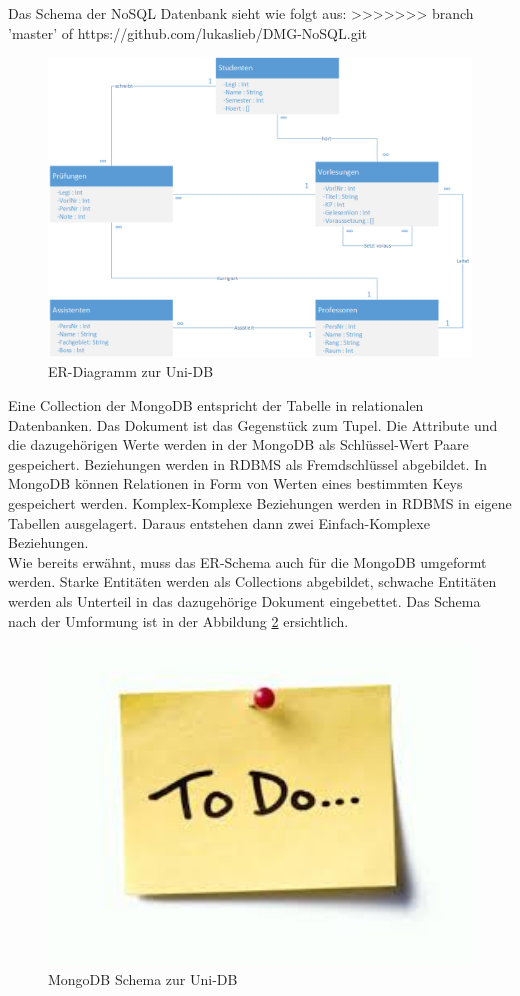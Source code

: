 \newpage
Das Schema der NoSQL Datenbank sieht wie folgt aus:
>>>>>>> branch 'master' of https://github.com/lukaslieb/DMG-NoSQL.git
\begin{figure}[h] 
	\centering
		\includegraphics[width=1\textwidth]{./pictures/NoSQL-DB_ER_Diagramm_UNI-DB.png}
	\caption{ER-Diagramm zur Uni-DB}
	\label{fig:uni-db}
\end{figure}
Eine Collection der MongoDB entspricht der Tabelle in relationalen Datenbanken.
Das Dokument ist das Gegenstück zum Tupel. Die Attribute und die dazugehörigen
Werte werden in der MongoDB als Schlüssel-Wert Paare gespeichert.
Beziehungen werden in RDBMS als Fremdschlüssel abgebildet. In MongoDB 
können Relationen in Form von Werten eines bestimmten Keys gespeichert werden.
Komplex-Komplexe Beziehungen werden in RDBMS in eigene
Tabellen ausgelagert. Daraus entstehen dann zwei Einfach-Komplexe
Beziehungen. \\
Wie bereits erwähnt, muss das ER-Schema auch für die MongoDB umgeformt werden.
Starke Entitäten werden als Collections abgebildet, schwache Entitäten werden 
als Unterteil in das dazugehörige Dokument eingebettet.
Das Schema nach der Umformung ist in der Abbildung \ref{fig:uni-dbNoSQL}
ersichtlich.
\begin{figure}[h] 
	\centering
		\includegraphics[width=1\textwidth]{./pictures/todo.jpg}
	\caption{MongoDB Schema zur Uni-DB }
	\label{fig:uni-dbNoSQL}
\end{figure}
